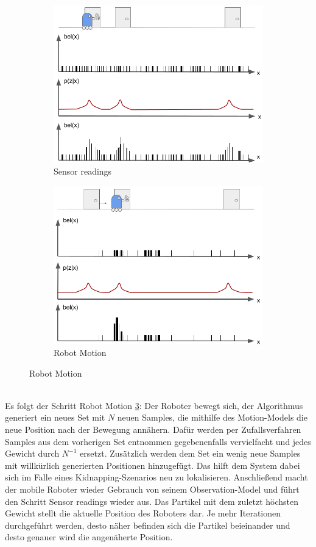 \mbox{}
\begin{figure}\label{fig:mcl}
  \begin{subfigure}[t]{.5\textwidth}
    \centering
    \includegraphics[width=.8\linewidth]{pic/loesungen/1a_mcl.png}
    \caption{Sensor readings}
    \label{fig:s_mcl_sensor}
  \end{subfigure}\hfill
  \begin{subfigure}[t]{.5\textwidth}
    \centering
    \includegraphics[width=.8\linewidth]{pic/loesungen/1b_mcl.png}
    \caption{Robot Motion}
    \label{fig:s_mcl_motion}
  \end{subfigure}
\end{figure}
\mbox{}
\\Es folgt der Schritt Robot Motion \ref{fig:s_mcl_motion}: Der Roboter bewegt sich, der Algorithmus generiert ein neues Set mit $N$ neuen Samples, die mithilfe des Motion-Models die neue Position nach der Bewegung annähern. Dafür werden per Zufallsverfahren Samples aus dem vorherigen Set entnommen gegebenenfalls vervielfacht und jedes Gewicht durch $N^{-1}$ ersetzt. Zusätzlich werden dem Set ein wenig neue Samples mit willkürlich generierten Positionen hinzugefügt. Das hilft dem System dabei sich im Falle eines Kidnapping-Szenarios neu zu lokalisieren. Anschließend macht der mobile Roboter wieder Gebrauch von seinem Observation-Model und führt den Schritt Sensor readings wieder aus. Das Partikel mit dem zuletzt höchsten Gewicht stellt die aktuelle Position des Roboters dar. Je mehr Iterationen durchgeführt werden, desto näher befinden sich die Partikel beieinander und desto genauer wird die angenäherte Position.

